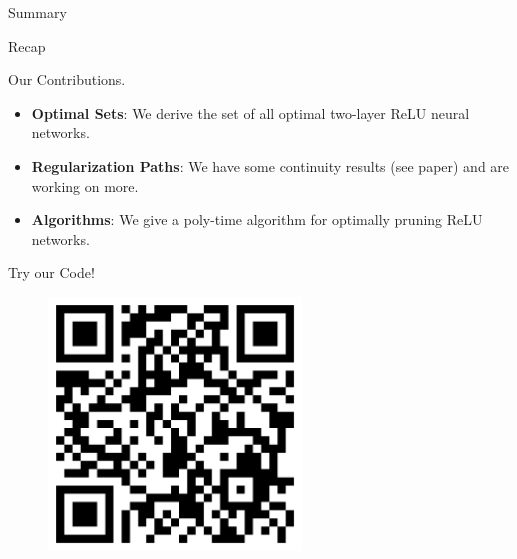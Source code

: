 \documentclass[usenames,dvipsnames,mathserif,notheorems]{beamer}
\begin{document}

\begin{frame}{}
	\begin{center}
		\huge Summary
	\end{center}
\end{frame}

\begin{frame}{Recap}
	\begin{center}
		\huge   Our Contributions.
	\end{center}

	\vspace{2em}
	\pause
	{ \large
		\begin{itemize}
			\item \textbf{Optimal Sets}: We derive the set of all optimal
			      two-layer ReLU neural networks.
			      \pause
			      \vspace{0.5em}

			\item \textbf{Regularization Paths}: We have some continuity
			      results (see paper) and are working on more.
			      \pause
			      \vspace{0.5em}

			\item \textbf{Algorithms}: We give a poly-time algorithm for
			      optimally pruning ReLU networks.

		\end{itemize}
	}

\end{frame}




\begin{frame}{}
	\begin{center}
		\huge Try our Code!
	\end{center}

	\begin{figure}[]
		\centering
		\includegraphics[width=0.6\textwidth]{assets/github.png}
	\end{figure}
\end{frame}
\end{document}

